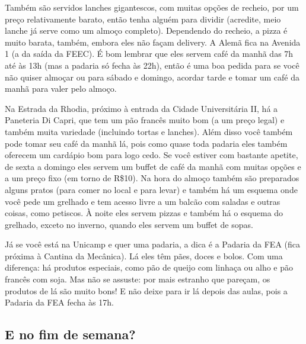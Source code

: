 Também são servidos lanches gigantescos, com muitas opções de recheio, por um
preço relativamente barato, então tenha alguém para dividir (acredite, meio
lanche já serve como um almoço completo). Dependendo do recheio, a pizza é muito
barata, também, embora eles não façam delivery. A Alemã fica na Avenida 1 (a da
saída da FEEC). É bom lembrar que eles servem café da manhã das 7h até às 13h
(mas a padaria só fecha às 22h), então é uma boa pedida para se você não quiser
almoçar ou para sábado e domingo, acordar tarde e tomar um café da manhã para
valer pelo almoço.

Na Estrada da Rhodia, próximo à entrada da Cidade Universitária II, há
a Paneteria Di Capri, que tem um pão francês muito bom (a um preço legal)
e também muita variedade (incluindo tortas e lanches). Além disso você também
pode tomar seu café da manhã lá, pois como quase toda padaria eles também
oferecem um cardápio bom para logo cedo. Se você estiver com bastante apetite,
de sexta a domingo eles servem um buffet de café da manhã com muitas opções
e a um preço fixo (em torno de R\$10). Na hora do almoço também são preparados
alguns pratos (para comer no local e para levar) e também há um esquema onde
você pede um grelhado e tem acesso livre a um balcão com saladas e outras
coisas, como petiscos. À noite eles servem pizzas e também há o esquema do
grelhado, exceto no inverno, quando eles servem um buffet de sopas.

Já se você está na Unicamp e quer uma padaria, a dica é a Padaria da FEA (fica
próxima à Cantina da Mecânica). Lá eles têm pães, doces e bolos. Com uma
diferença: há produtos especiais, como pão de queijo com linhaça ou alho e pão
francês com soja. Mas não se assuste: por mais estranho que pareçam, os produtos
de lá são muito bons! E não deixe para ir lá depois das aulas, pois a Padaria da
FEA fecha às 17h.

\subsection{E no fim de semana?}


